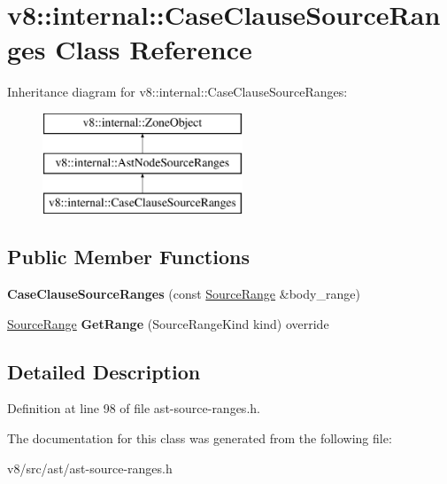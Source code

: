 \hypertarget{classv8_1_1internal_1_1CaseClauseSourceRanges}{}\section{v8\+:\+:internal\+:\+:Case\+Clause\+Source\+Ranges Class Reference}
\label{classv8_1_1internal_1_1CaseClauseSourceRanges}
Inheritance diagram for v8\+:\+:internal\+:\+:Case\+Clause\+Source\+Ranges\+:\begin{figure}[H]
\begin{center}
\leavevmode
\includegraphics[height=3.000000cm]{classv8_1_1internal_1_1CaseClauseSourceRanges}
\end{center}
\end{figure}
\subsection*{Public Member Functions}
\begin{DoxyCompactItemize}
\item 
\mbox{\label{classv8_1_1internal_1_1CaseClauseSourceRanges_af6b0ca7b41a429049b10465e53f0d426}} 
{\bfseries Case\+Clause\+Source\+Ranges} (const \mbox{\hyperlink{structv8_1_1internal_1_1SourceRange}{Source\+Range}} \&body\+\_\+range)
\item 
\mbox{\label{classv8_1_1internal_1_1CaseClauseSourceRanges_a2416e3f442b52663b31d393c76c5a80e}} 
\mbox{\hyperlink{structv8_1_1internal_1_1SourceRange}{Source\+Range}} {\bfseries Get\+Range} (Source\+Range\+Kind kind) override
\end{DoxyCompactItemize}


\subsection{Detailed Description}


Definition at line 98 of file ast-\/source-\/ranges.\+h.



The documentation for this class was generated from the following file\+:\begin{DoxyCompactItemize}
\item 
v8/src/ast/ast-\/source-\/ranges.\+h\end{DoxyCompactItemize}
